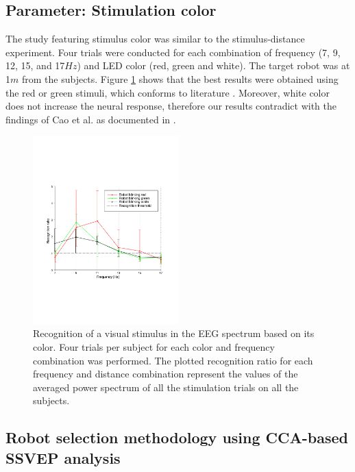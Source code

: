 \documentclass[smallextended]{svjour3}
\begin{document}
\subsection{Parameter: Stimulation color}
The study featuring stimulus color was similar to the stimulus-distance experiment. Four trials were conducted for each combination of frequency (7, 9, 12, 15, and 17$Hz$) and LED color (red, green and white). The target robot was at 1$m$ from the subjects. Figure \ref{fig:graph-couleurs} shows that the best results were obtained using the red or green stimuli, which conforms to literature \cite{chua2004effects,duvinage2013performance,paper_5,hvaring2014comparison}. Moreover, white color does not increase the neural response, therefore our results contradict with the findings of Cao et al. as documented in \cite{cao2012flashing}. 

\begin{figure}
\center
\includegraphics[width=0.5\textwidth]{figures/graph-couleurs.pdf}
\caption{Recognition of a visual stimulus in the EEG spectrum based on its color. Four trials per subject for each color and frequency combination was performed. The plotted recognition ratio for each frequency and distance combination represent the values of the averaged power spectrum of all the stimulation trials on all the subjects.} \label{fig:graph-couleurs}
\end{figure}

\subsection{Robot selection methodology using CCA-based SSVEP analysis}
\end{document}
